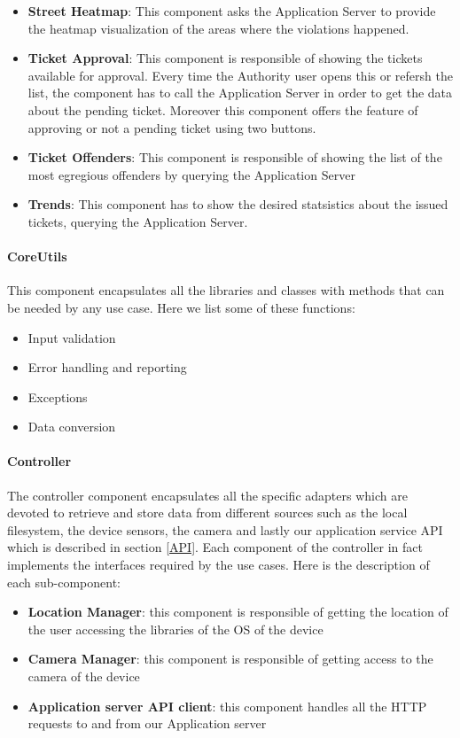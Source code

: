\begin{itemize}
  \item \textbf{Street Heatmap}: This component asks the Application Server to provide the heatmap visualization of the areas where the violations happened.
  \item \textbf{Ticket Approval}: This component is responsible of showing the tickets available for approval. Every time the Authority user opens this or refersh the list, the component has to call the Application Server in order to get the data about the pending ticket. Moreover this component offers the feature of approving or not a pending ticket using two buttons.
  \item \textbf{Ticket Offenders}: This component is responsible of showing the list of the most egregious offenders by querying the Application Server
  \item \textbf{Trends}: This component has to show the desired statsistics about the issued tickets, querying the Application Server.
\end{itemize}

\paragraph{CoreUtils}
This component encapsulates all the libraries and classes with methods that can be needed by any use case.
Here we list some of these functions:
\begin{itemize}
  \item Input validation
  \item Error handling and reporting
  \item Exceptions
  \item Data conversion
\end{itemize}

\paragraph{Controller}
The controller component  encapsulates all the specific adapters which are devoted to retrieve and store data from different sources such as the local filesystem, the device sensors, the camera and lastly our application service API which is described in section \ref{API}.
Each component of the controller in fact implements the interfaces required by the use cases.
Here is the description of each sub-component:
\begin{itemize}
  \item \textbf{Location Manager}: this component is responsible of getting the location of the user accessing the libraries of the OS of the device
  \item \textbf{Camera Manager}: this component is responsible of getting access to the camera of the device
  \item \textbf{Application server API client}: this component handles all the HTTP requests to and from our Application server
\end{itemize}

